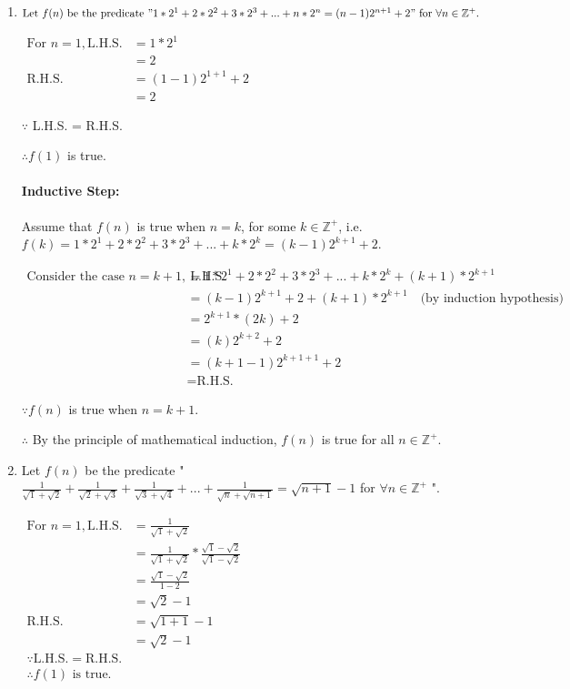 \documentclass{article}
\begin{document}
\begin{enumerate}[label=(\alph*)]

\item $\text{Let } f(n) \text{ be the predicate } "1*2^1 + 2*2^2 + 3*2^3 + ... + n*2^n = (n-1)2^{n+1} + 2" \text{ for } \forall n \in \mathbb{Z}^+.$

$\begin{aligned}
\text{For } n=1, \text{L.H.S.} &= 1*2^1 \\
&= 2 \\
\text{R.H.S.} &= (1-1)2^{1+1} + 2 \\
&= 2
\end{aligned}$

$\because$ L.H.S. = R.H.S.

$\therefore f(1)$ is true.

\paragraph*{Inductive Step:\\}
Assume that $f(n)$ is true when $n = k$, for some $k \in \mathbb{Z}^+$, i.e. $f(k) = 1*2^1 + 2*2^2 + 3*2^3 + ... + k*2^k = (k-1)2^{k+1} + 2$.

$\begin{aligned}
\text{Consider the case } n=k+1, \ \text{L.H.S.} &= 1*2^1 + 2*2^2 + 3*2^3 + ... + k*2^k + (k+1)*2^{k+1} \\
&= (k-1)2^{k+1} + 2 + (k+1)*2^{k+1} \quad \text{(by induction hypothesis)} \\
&= 2^{k+1} * (2k) + 2 \\
&= (k)2^{k+2} + 2 \\
&= (k+1-1)2^{k+1+1} + 2 \\
&= \text{R.H.S.}
\end{aligned}$

$\because f(n)$ is true when $n = k+1$.

$\therefore$ By the principle of mathematical induction,
$f(n)$ is true for all $n \in \mathbb{Z}^+$.

\item Let $f(n)$ be the predicate "$\frac{1}{\sqrt{1}+\sqrt{2}} + \frac{1}{\sqrt{2}+\sqrt{3}} + \frac{1}{\sqrt{3}+\sqrt{4}} + ... + \frac{1}{\sqrt{n}+\sqrt{n+1}} = \sqrt{n+1}-1$ for $\forall n \in \mathbb{Z}^+$ ".

$\begin{aligned}
\text{For } n=1, \text{L.H.S.} &= \frac{1}{\sqrt{1}+\sqrt{2}} \\
&= \frac{1}{\sqrt{1}+\sqrt{2}} * \frac{\sqrt{1}-\sqrt{2}}{\sqrt{1}-\sqrt{2}} \\
&= \frac{\sqrt{1}-\sqrt{2}}{1-2} \\
&= \sqrt{2} - 1 \\
\text{R.H.S.} &= \sqrt{1+1} - 1 \\
&= \sqrt{2} - 1 \\
\because \text{L.H.S.} = \text{R.H.S.} \\
\therefore f(1) \text{ is true.}
\end{aligned}$


\end{enumerate}
\end{document}
